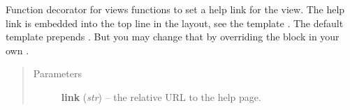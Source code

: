 \documentclass[a4paper,11pt,english]{sphinxmanual}
\begin{document}
\begin{fulllineitems}
\label{programming/utilities:jb_common.utils.base.help_link}
Function decorator for views functions to set a help link for the view.  The
help link is embedded into the top line in the layout, see the template
.  The default template  prepends
.  But you may change that by overriding the
 block in your own .
\begin{quote}\begin{description}
\item[{Parameters}] \leavevmode
\textbf{link} (\emph{str}) -- the relative URL to the help page.

\end{description}\end{quote}

\end{fulllineitems}

\end{document}
